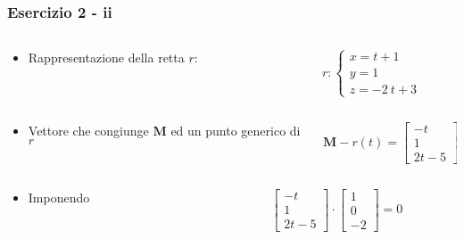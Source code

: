 \documentclass{beamer}
\begin{document}
\begin{frame}
\frametitle{Esercizio 2 - ii}
\begin{columns}
\begin{column}{0.48\textwidth}
\begin{itemize}
\item Rappresentazione della retta $r$:
\end{itemize}
\end{column}
\begin{column}{0.48\textwidth}
\begin{displaymath}
r :\begin{cases} x = t +1\\ y = 1 \\z = -2~t+3 \end{cases}
\end{displaymath}
\end{column}
\end{columns}
\begin{columns}
\begin{column}{0.48\textwidth}
\begin{itemize}
\item Vettore che congiunge $\mathbf{M}$ ed un punto generico di $r$
\end{itemize}
\end{column}
\begin{column}{0.48\textwidth}
\begin{displaymath}
\mathbf{M} - r(t) = \begin{bmatrix} -t\\ 1 \\2t-5 \end{bmatrix}
\end{displaymath}
\end{column}
\end{columns}
\begin{columns}
\begin{column}{0.29\textwidth}
\begin{itemize}
\item Imponendo
\end{itemize}
\end{column}
\begin{column}{0.4\textwidth}
\begin{displaymath}
\begin{bmatrix} -t \\ 1 \\2t-5 \end{bmatrix}\cdot \begin{bmatrix}1\\ 0 \\-2 \end{bmatrix} = 0

\end{displaymath}
\end{column}
\end{columns}
\end{frame}
\end{document}
